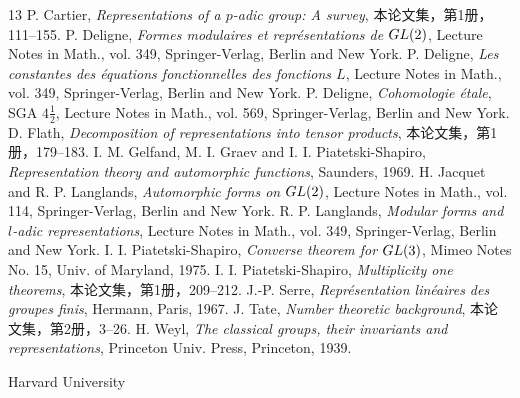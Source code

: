 \begin{thebibliography}{13}
 P. Cartier, \textit{Representations of a $p$-adic group: A survey}, 本论文集，第1册，111--155.
 P. Deligne, \textit{Formes modulaires et représentations de $GL(2)$}, Lecture Notes in Math., vol. 349, Springer-Verlag, Berlin and New York.
 P. Deligne, \textit{Les constantes des équations fonctionnelles des fonctions $L$}, Lecture Notes in Math., vol. 349, Springer-Verlag, Berlin and New York.
 P. Deligne, \textit{Cohomologie étale}, SGA $4\frac12$, Lecture Notes in Math., vol. 569, Springer-Verlag, Berlin and New York.
 D. Flath, \textit{Decomposition of representations into tensor products}, 本论文集，第1册，179--183.
 I. M. Gelfand, M. I. Graev and I. I. Piatetski-Shapiro, \textit{Representation theory and automorphic functions}, Saunders, 1969.
 H. Jacquet and R. P. Langlands, \textit{Automorphic forms on $GL(2)$}, Lecture Notes in Math., vol. 114, Springer-Verlag, Berlin and New York.
 R. P. Langlands, \textit{Modular forms and $l$-adic representations}, Lecture Notes in Math., vol. 349, Springer-Verlag, Berlin and New York.
 I. I. Piatetski-Shapiro, \textit{Converse theorem for $GL(3)$}, Mimeo Notes No. 15, Univ. of Maryland, 1975.
 I. I. Piatetski-Shapiro, \textit{Multiplicity one theorems}, 本论文集，第1册，209--212.
 J.-P. Serre, \textit{Représentation linéaires des groupes finis}, Hermann, Paris, 1967.
 J. Tate, \textit{Number theoretic background}, 本论文集，第2册，3--26.
 H. Weyl, \textit{The classical groups, their invariants and representations}, Princeton Univ. Press, Princeton, 1939.
\end{thebibliography}
\begin{flushright}Harvard University\end{flushright}
